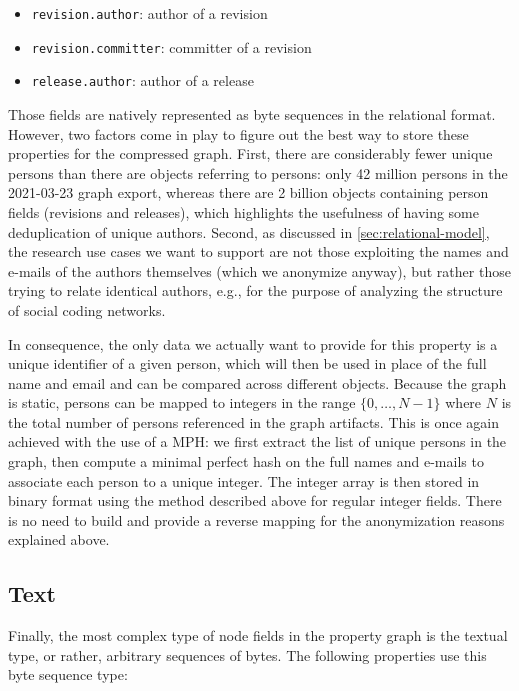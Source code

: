 \begin{itemize}
    \setlength\itemsep{0em}
    \item \texttt{revision.author}: author of a revision
    \item \texttt{revision.committer}: committer of a revision
    \item \texttt{release.author}: author of a release
\end{itemize}

Those fields are natively represented as byte sequences in the relational
format.  However, two factors come in play to figure out the best way to store
these properties for the compressed graph. First, there are considerably fewer
unique persons than there are objects referring to persons: only 42 million
persons in the 2021-03-23 graph export, whereas there are 2 billion objects
containing person fields (revisions and releases), which highlights the
usefulness of having some deduplication of unique authors. Second, as discussed
in \cref{sec:relational-model}, the research use cases we want to support are
not those exploiting the names and e-mails of the authors themselves (which we
anonymize anyway), but rather those trying to relate identical authors, e.g.,
for the purpose of analyzing the structure of social coding networks.

In consequence, the only data we actually want to provide for this property is
a unique identifier of a given person, which will then be used in place of the
full name and email and can be compared across different objects.
Because the graph is static, persons can be mapped to integers in the range
$\{0,\ldots,N-1\}$ where $N$ is the total number of persons referenced in the
graph artifacts. This is once again achieved with the use of a \gls{MPH}: we
first extract the list of unique persons in the graph, then compute a minimal
perfect hash on the full names and e-mails to associate each person to a unique
integer. The integer array is then stored in binary format using the method
described above for regular integer fields. There is no need to build and
provide a reverse mapping for the anonymization reasons explained above.

\subsection{Text}%
\label{sec:mapping-text}

Finally, the most complex type of node fields in the property graph is the
textual type, or rather, arbitrary sequences of bytes. The following properties
use this byte sequence type:

